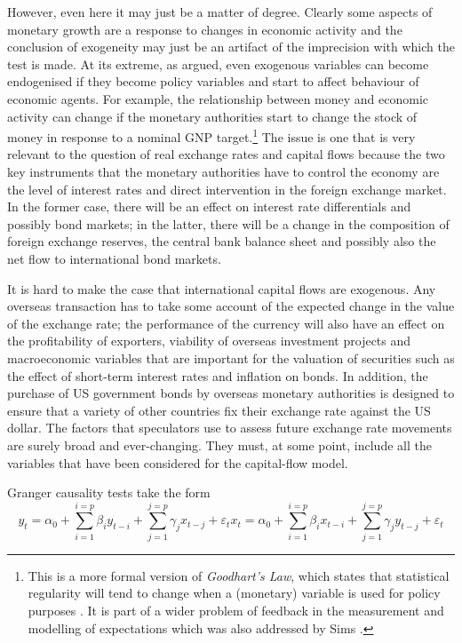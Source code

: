 \documentclass[12pt, a4paper, oneside]{article}\usepackage[]{graphicx}\usepackage[]{color}
\begin{document}
However, even here it may just be a matter of degree.  Clearly some aspects of monetary growth are a response to changes in economic activity and the conclusion of exogeneity may just be an artifact of the imprecision with which the test is made.  At its extreme, as \citet{Lucas1976Critique} argued, even exogenous variables can become endogenised if they become policy variables and start to affect behaviour of economic agents.  For example,  the relationship between money and economic activity can change if the monetary authorities start to change the stock of money in response to a nominal GNP target.\footnote{This is a more formal version of \emph{Goodhart's Law}, which states that statistical regularity will tend to change when a (monetary) variable is used for policy purposes  \citep{Goodhart1975Monetary}. It is part of a wider problem of feedback in the measurement and modelling of expectations which was also addressed by Sims \citep{Sims1980Macroeconomics}.}  The issue is one that is very relevant to the question of real exchange rates and capital flows because the two key instruments that the monetary authorities have to control the economy are the level of interest rates and direct intervention in the foreign exchange market.  In the former case, there will be an effect on interest rate differentials and possibly bond markets; in the latter, there will be a change in the composition of foreign exchange reserves, the central bank balance sheet and possibly also the net flow to international bond markets.   

It is hard to make the case that international capital flows are exogenous.  Any overseas transaction has to take some account of the expected change in the value of the exchange rate; the performance of the currency will also have an effect on the profitability of exporters, viability of overseas investment projects and macroeconomic variables that are important for the valuation of securities such as the effect of short-term interest rates and inflation on bonds.  In addition, the purchase of US government bonds by overseas monetary authorities is designed to ensure that a variety of other countries fix their exchange rate against the US dollar.  The factors that speculators use to assess future exchange rate movements are surely broad and ever-changing.  They must, at some point, include all the variables that have been considered for the capital-flow model.     

Granger causality tests take the form
\begin{subequations}
\begin{equation}
y_t = \alpha_0 + \sum_{i=1}^{i=p} \beta_i y_{t-i} + \sum_{j=1}^{j=p} \gamma_j x_{t-j} + \varepsilon_t
\end{equation}
\begin{equation}
x_t = \alpha_0 + \sum_{i=1}^{i=p} \beta_i x_{t-i} + \sum_{j=1}^{j=p} \gamma_j y_{t-j} + \varepsilon_t
\end{equation}
\end{subequations}
\end{document}
